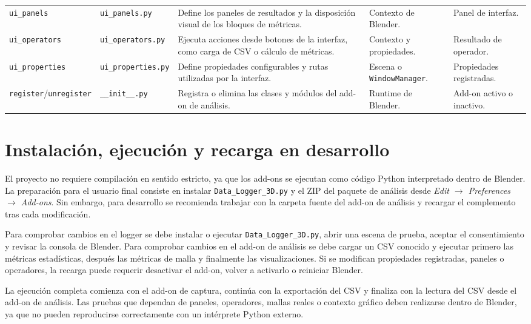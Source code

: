 {\begin{landscape}
\begin{longtable}{p{4.7cm}p{3.2cm}p{8.5cm}p{3.8cm}p{3.8cm}}
\texttt{ui\_panels} & \texttt{ui\_panels.py} & Define los paneles de resultados y la disposición visual de los bloques de métricas. & Contexto de Blender. & Panel de interfaz. \\
\texttt{ui\_operators} & \texttt{ui\_operators.py} & Ejecuta acciones desde botones de la interfaz, como carga de CSV o cálculo de métricas. & Contexto y propiedades. & Resultado de operador. \\
\texttt{ui\_properties} & \texttt{ui\_properties.py} & Define propiedades configurables y rutas utilizadas por la interfaz. & Escena o \texttt{WindowManager}. & Propiedades registradas. \\
\texttt{register}/\texttt{unregister} & \texttt{\_\_init\_\_.py} & Registra o elimina las clases y módulos del add-on de análisis. & Runtime de Blender. & Add-on activo o inactivo. \\
\end{longtable}
\endgroup
\end{landscape}
}

\clearpage
\section{Instalación, ejecución y recarga en desarrollo}
\label{sec:d-instalacion-ejecucion}

El proyecto no requiere compilación en sentido estricto, ya que los add-ons se ejecutan como código Python interpretado dentro de Blender. La preparación para el usuario final consiste en instalar \texttt{Data\_Logger\_3D.py} y el ZIP del paquete de análisis desde \textit{Edit $\rightarrow$ Preferences $\rightarrow$ Add-ons}. Sin embargo, para desarrollo se recomienda trabajar con la carpeta fuente del add-on de análisis y recargar el complemento tras cada modificación.

Para comprobar cambios en el logger se debe instalar o ejecutar 
\texttt{Data\_Logger\_3D.py}, abrir una escena de prueba, aceptar el consentimiento y revisar la consola de Blender. Para comprobar cambios en el add-on de análisis se debe cargar un CSV conocido y ejecutar primero las métricas estadísticas, después las métricas de malla y finalmente las visualizaciones. Si se modifican propiedades registradas, paneles o operadores, la recarga puede requerir desactivar el add-on, volver a activarlo o reiniciar Blender.

La ejecución completa comienza con el add-on de captura, continúa con la exportación del CSV y finaliza con la lectura del CSV desde el add-on de análisis. Las pruebas que dependan de paneles, operadores, mallas reales o contexto gráfico deben realizarse dentro de Blender, ya que no pueden reproducirse correctamente con un intérprete Python externo.

